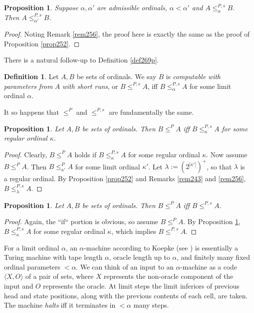 \documentclass[12pt, twoside]{memoir}
\numberwithin{equation}{section}
\newtheorem{prop}[thm]{Proposition}
\theoremstyle{definition}
\newtheorem{defi}[thm]{Definition}
\theoremstyle{remark}
\theoremstyle{definition}
\theoremstyle{definition}
\theoremstyle{definition}
\theoremstyle{remark}
\begin{document}
\begin{prop}\label{prop271n}
Suppose $\alpha, \alpha'$ are admissible ordinals, $\alpha < \alpha'$ and $A \leq^{P, s}_{\alpha} B$. Then $A \leq^{P, s}_{\alpha'} B$.
\end{prop}

\begin{proof}
Noting Remark \ref{rem256}, the proof here is exactly the same as the proof of Proposition \ref{prop252}.
\end{proof}

There is a natural follow-up to Definition \ref{def269p}.

\begin{defi}\label{def8329}
Let $A, B$ be sets of ordinals. We say $B$ is \emph{computable with parameters from} $A$ \emph{with short runs}, or $B \leq^{P, s} A$, iff $B \leq^{P, s}_{\alpha} A$ for some limit ordinal $\alpha$.
\end{defi}

It so happens that $\leq^P$ and $\leq^{P, s}$ are fundamentally the same.

\begin{prop}\label{prop271}
Let $A, B$ be sets of ordinals. Then $B \leq^P A$ iff $B \leq^{P, s}_{\kappa} A$ for some regular ordinal $\kappa$.
\end{prop}

\begin{proof}
Clearly, $B \leq^P A$ holds if $B \leq^{P, s}_{\kappa} A$ for some regular ordinal $\kappa$. Now assume $B \leq^P A$. Then $B \leq^P_{\kappa'} A$ for some limit ordinal $\kappa'$. Let $\lambda := (2^{|\kappa'|})^+$, so that $\lambda$ is a regular ordinal. By Proposition \ref{prop252} and Remarks \ref{rem243} and \ref{rem256}, $B \leq^{P, s}_{\lambda} A$.
\end{proof}

\begin{prop}
Let $A, B$ be sets of ordinals. Then $B \leq^P A$ iff $B \leq^{P, s} A$.
\end{prop}

\begin{proof}
Again, the ``if`` portion is obvious, so assume $B \leq^P A$. By Proposition \ref{prop271}, $B \leq^{P, s}_{\kappa} A$ for some regular ordinal $\kappa$, which implies $B \leq^{P, s} A$.
\end{proof}

For a limit ordinal $\alpha$, an $\alpha$-machine according to Koepke (see \cite{koepke2}) is essentially a Turing machine with tape length $\alpha$, oracle length up to $\alpha$, and finitely many fixed ordinal parameters $< \alpha$. We can think of an input to an $\alpha$-machine as a code $\langle X, O \rangle$ of a pair of sets, where $X$ represents the non-oracle component of the input and $O$ represents the oracle. At limit steps the limit inferiors of previous head and state positions, along with the previous contents of each cell, are taken. The machine \emph{halts} iff it terminates in $< \alpha$ many steps.
\end{document}
